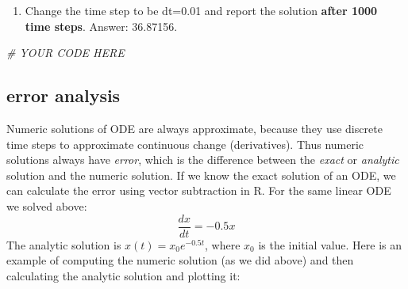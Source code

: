 \documentclass[
]{book}
\newenvironment{Shaded}{\begin{snugshade}}{\end{snugshade}}
\newcommand{\CommentTok}[1]{\textcolor[rgb]{0.56,0.35,0.01}{\textit{#1}}}
\providecommand{\tightlist}{%
  \setlength{\itemsep}{0pt}\setlength{\parskip}{0pt}}
\theoremstyle{definition}
\theoremstyle{definition}
\theoremstyle{definition}
\theoremstyle{remark}
\begin{document}
\begin{enumerate}
\def\labelenumi{\arabic{enumi}.}
\setcounter{enumi}{2}
\tightlist
\item
  Change the time step to be dt=0.01 and report the solution \textbf{after 1000 time steps}. Answer: 36.87156.
\end{enumerate}

\begin{Shaded}
\begin{Highlighting}[]
\CommentTok{\# YOUR CODE HERE}
\end{Highlighting}
\end{Shaded}

\hypertarget{error-analysis}{%
\subsection{error analysis}\label{error-analysis}}

Numeric solutions of ODE are always approximate, because they use discrete time steps to approximate continuous change (derivatives). Thus numeric solutions always have \emph{error}, which is the difference between the \emph{exact} or \emph{analytic} solution and the numeric solution. If we know the exact solution of an ODE, we can calculate the error using vector subtraction in R. For the same linear ODE we solved above:
\[ 
\frac{dx}{dt} =  -0.5 x 
\]
The analytic solution is \(x(t) = x_0 e^{-0.5t}\), where \(x_0\) is the initial value. Here is an example of computing the numeric solution (as we did above) and then calculating the analytic solution and plotting it:
\end{document}
